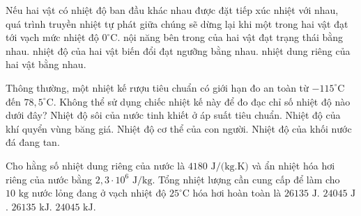 \begin{ex}%
	Nếu hai vật có nhiệt độ ban đầu khác nhau được đặt tiếp xúc nhiệt với nhau, quá trình truyền nhiệt tự phát giữa chúng sẽ dừng lại khi
	\choice
	{một trong hai vật đạt tới vạch mức nhiệt độ $0^\circ\text{C}$.}
	{nội năng bên trong của hai vật đạt trạng thái bằng nhau.}
	{\True nhiệt độ của hai vật biến đổi đạt ngưỡng bằng nhau.}
	{nhiệt dung riêng của hai vật bằng nhau.}
\end{ex}

\begin{ex}%
	Thông thường, một nhiệt kế rượu tiêu chuẩn có giới hạn đo an toàn từ $-115^\circ\text{C}$ đến $78,5^\circ\text{C}$. Không thể sử dụng chiếc nhiệt kế này để đo đạc chỉ số nhiệt độ nào dưới đây?
	\choice
	{\True Nhiệt độ sôi của nước tinh khiết ở áp suất tiêu chuẩn.}
	{Nhiệt độ của khí quyển vùng băng giá.}
	{Nhiệt độ cơ thể của con người.}
	{Nhiệt độ của khối nước đá đang tan.}
\end{ex}

\begin{ex}%
	Cho hằng số nhiệt dung riêng của nước là $4180\text{ J/(kg.K)}$ và ẩn nhiệt hóa hơi riêng của nước bằng $2,3 \cdot 10^6\text{ J/kg}$. Tổng nhiệt lượng cần cung cấp để làm cho $10\text{ kg}$ nước lỏng đang ở vạch nhiệt độ $25^\circ\text{C}$ hóa hơi hoàn toàn là
	\choice
	{$26135\text{ J}$.}
	{$24045\text{ J}$.}
	{\True $26135\text{ kJ}$.}
	{$24045\text{ kJ}$.}
\end{ex}

